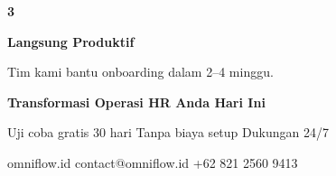 \documentclass[a4paper]{article}
\begin{document}
\begin{center}
\begin{minipage}[t]{0.318\textwidth}
{\begin{minipage}{\dimexpr\linewidth-2\fboxsep\relax}
            \begin{center}
                {\fontsize{22}{26}\selectfont\bfseries\color{BluePrimary} 3}
            \end{center}
            \vspace{2pt}
            \begin{center}
                {\fontsize{10}{13}\selectfont\bfseries\color{BlueDark} Langsung Produktif}\par\vspace{3pt}
                {\fontsize{9}{12}\selectfont\color{TextDark} Tim kami bantu onboarding dalam 2--4 minggu.}
            \end{center}
            \vspace{6pt}
        \end{minipage}}
\end{minipage}
\end{center}

\vspace{8pt}

{\setlength{\fboxsep}{10pt}\setlength{\fboxrule}{0pt}%
\noindent\colorbox{BluePrimary}{%
    \begin{minipage}{\dimexpr\textwidth-2\fboxsep\relax}
        \centering
        {\fontsize{13}{16}\selectfont\bfseries\color{White}
        Transformasi Operasi HR Anda Hari Ini}\par\vspace{3pt}
        {\fontsize{9.5}{12}\selectfont\color{BlueMid}
        Uji coba gratis 30 hari \enspace\textbullet\enspace Tanpa biaya setup \enspace\textbullet\enspace Dukungan 24/7}\par\vspace{2pt}
        {\fontsize{9.5}{12}\selectfont\color{BlueLight}
        omniflow.id \enspace\textbullet\enspace contact@omniflow.id \enspace\textbullet\enspace +62 821 2560 9413}
    \end{minipage}}}

\restoregeometry
\pagestyle{empty}
\end{document}
